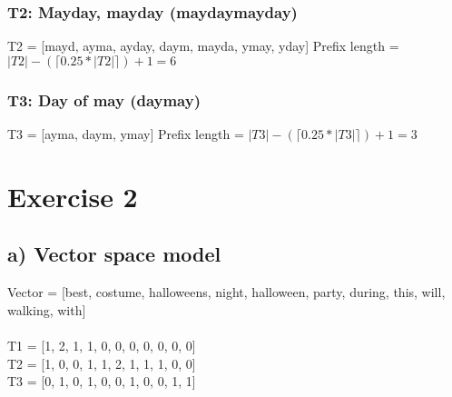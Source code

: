 \documentclass{article}
\begin{document}
\subsubsection*{T2: Mayday, mayday (mayday\textvisiblespace mayday)}
T2 = [\textvisiblespace mayd, ay\textvisiblespace ma, ayday, day\textvisiblespace m, mayda, y\textvisiblespace may, yday\textvisiblespace ]
Prefix length = $|T2| - (\lceil 0.25 * |T2| \rceil ) + 1 = 6$

\subsubsection*{T3: Day of may (day\textvisiblespace may)}
T3 = [ay\textvisiblespace ma, day\textvisiblespace m, y\textvisiblespace may]
Prefix length = $|T3| - (\lceil 0.25 * |T3| \rceil ) + 1 = 3$


\vspace{2cm}
\section*{Exercise 2}
\subsection*{a) Vector space model}
Vector = [best, costume, halloweens, night, halloween, party, during, this,
will, walking, with]\\
\\
T1 = [1, 2, 1, 1, 0, 0, 0, 0, 0, 0, 0]\\
T2 = [1, 0, 0, 1, 1, 2, 1, 1, 1, 0, 0]\\
T3 = [0, 1, 0, 1, 0, 0, 1, 0, 0, 1, 1]
\end{document}
